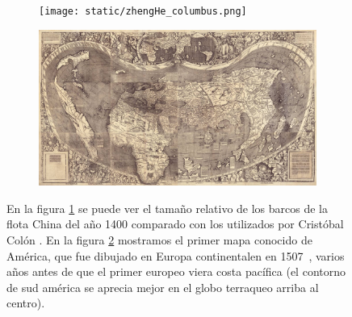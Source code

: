 \documentclass[a4paper,10pt]{book}
\newif\ifes
\newcommand{\es}[1]{\ifes#1\fi}
\begin{document}
\es{Quizás el centro más avanzado en términos científicos y tecnologías haya sido la región de China~\cite{needham2004-generalConclusionsAndReflections}.}%
%
\es{China fue desde por lo menos el siglo segundo antes de cristo el centro del mundo productivo del mundo, de donde los Romanos se abastec\'ian de seda.}%
%
\es{Desarrolla el acero en el siglo segundo, el papel en el siglo sexto, la imprenta en el siglo octavo, el papel moneda en el noveno, la br\'ujula en el onceavo.}%
%
\es{Para el año 1400, China llevaba al menos 2000 de continuidad socio-pol\'itica, y 900 a\~nos de un estado meritocr\'atico, en el cual sus miembros eran elegidos a trav\'es de un examen imperial.}%
%
\es{China era una región autónoma y autosuficiente, impulsora de innovaciones.}%
%
\es{Es así como China si bien desarrolla una de las flotas más increibles de la Historia durante el 1400, luego de la serie de expediciones de Zheng He (1405-1433) el Gobierno Chino decide cerrarse fronteras adentro y dándolas por finalizadas definitivamente.}%
%
\es{No parecían necesitar nada afuera de sus fronteras.}%
\begin{figure}[ht!]     
  \centering 
  \begin{subfigure}[b]{0.35\textwidth}
    \texttt{[image: static/zhengHe\_columbus.png]} 
    \caption{}
    \label{fig:zhengHe_columbus}
  \end{subfigure}
  \begin{subfigure}[b]{0.5\textwidth}
    \includegraphics[width=\textwidth]{static/mapaWaldseemuller.jpg} 
    \caption{}
    \label{fig:mapaWaldseemuller}
  \end{subfigure}
  \caption{
  En la figura \ref{fig:zhengHe_columbus} se puede ver el tama\~no relativo de los barcos de la flota China del a\~no 1400 comparado con los utilizados por Cristóbal Col\'on \cite{pomeranz2000-divergence}.
  En la figura \ref{fig:mapaWaldseemuller} mostramos el primer mapa conocido de América, que fue dibujado en Europa continentalen en 1507~\cite{waldseemuller1959-universalisCosmographia}, varios años antes de que el primer europeo viera costa pacífica (el contorno de sud américa se aprecia mejor en el globo terraqueo arriba al centro).
  }
  \label{zhengHe_columbus}
\end{figure}
\end{document}
